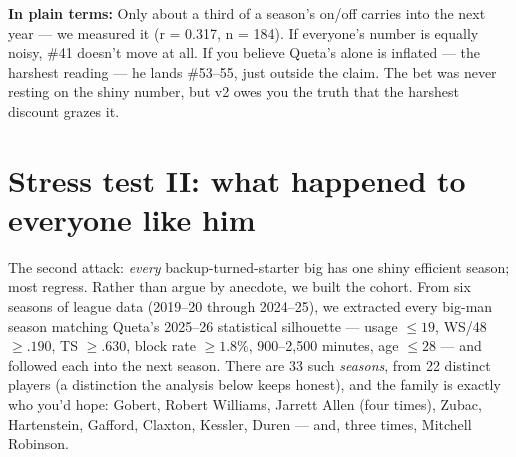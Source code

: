 \documentclass[11pt]{article}
\newcommand{\plainbox}[1]{\par\medskip\noindent\begin{center}%
\colorbox{court!8}{\parbox{0.93\textwidth}{\small \textbf{\textcolor{court}{In plain terms:}} #1}}%
\end{center}\medskip}
\begin{document}
\plainbox{Only about a third of a season's on/off carries into the next year --- we
measured it (r = 0.317, n = 184). If everyone's number is equally noisy, \#41 doesn't
move at all. If you believe Queta's alone is inflated --- the harshest reading --- he
lands \#53--55, just outside the claim. The bet was never resting on the shiny number,
but v2 owes you the truth that the harshest discount grazes it.}

\section{Stress test II: what happened to everyone like him}
\label{sec:comps}

The second attack: \emph{every} backup-turned-starter big has one shiny efficient
season; most regress. Rather than argue by anecdote, we built the cohort. From six
seasons of league data (2019--20 through 2024--25), we extracted every big-man season
matching Queta's 2025--26 statistical silhouette --- usage $\le 19$, WS/48 $\ge .190$,
TS $\ge .630$, block rate $\ge 1.8\%$, 900--2{,}500 minutes, age $\le 28$ --- and
followed each into the next season. There are 33 such \emph{seasons}, from 22 distinct
players (a distinction the analysis below keeps honest), and the family is exactly who
you'd hope: Gobert, Robert Williams, Jarrett Allen (four times), Zubac, Hartenstein,
Gafford, Claxton, Kessler, Duren --- and, three times, Mitchell Robinson.
\end{document}
